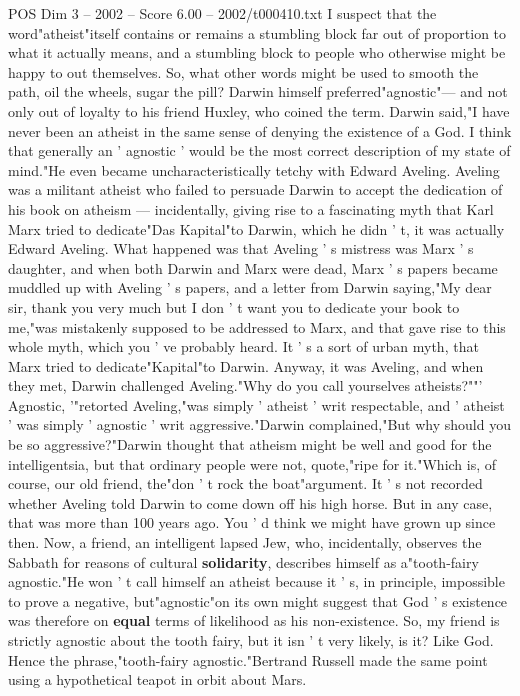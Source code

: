 \begin{textsample}{POS Dim 3 – 2002 – Score 6.00 – 2002/t000410.txt}
I suspect that the word"atheist"itself contains or remains a stumbling block far out of proportion to what it actually means, and a stumbling block to people who otherwise might be happy to out themselves.
So, what other words might be used to smooth the path, oil the wheels, sugar the pill?
Darwin himself preferred"agnostic"— and not only out of loyalty to his friend Huxley, who coined the term.
Darwin said,"I have never been an atheist in the same sense of denying the existence of a God.
I think that generally an ' agnostic ' would be the most correct description of my state of mind."He even became uncharacteristically tetchy with Edward Aveling.
Aveling was a militant atheist who failed to persuade Darwin to accept the dedication of his book on atheism — incidentally, giving rise to a fascinating myth that Karl Marx tried to dedicate"Das Kapital"to Darwin, which he didn ' t, it was actually Edward Aveling.
What happened was that Aveling ' s mistress was Marx ' s daughter, and when both Darwin and Marx were dead, Marx ' s papers became muddled up with Aveling ' s papers, and a letter from Darwin saying,"My dear sir, thank you very much but I don ' t want you to dedicate your book to me,"was mistakenly supposed to be addressed to Marx, and that gave rise to this whole myth, which you ' ve probably heard.
It ' s a sort of urban myth, that Marx tried to dedicate"Kapital"to Darwin.
Anyway, it was Aveling, and when they met, Darwin challenged Aveling."Why do you call yourselves atheists?""' Agnostic, '"retorted Aveling,"was simply ' atheist ' writ respectable, and ' atheist ' was simply ' agnostic ' writ aggressive."Darwin complained,"But why should you be so aggressive?"Darwin thought that atheism might be well and good for the intelligentsia, but that ordinary people were not, quote,"ripe for it."Which is, of course, our old friend, the"don ' t rock the boat"argument.
It ' s not recorded whether Aveling told Darwin to come down off his high horse.
But in any case, that was more than 100 years ago.
You ' d think we might have grown up since then.
Now, a friend, an intelligent lapsed Jew, who, incidentally, observes the Sabbath for reasons of cultural \textbf{solidarity}, describes himself as a"tooth-fairy agnostic."He won ' t call himself an atheist because it ' s, in principle, impossible to prove a negative, but"agnostic"on its own might suggest that God ' s existence was therefore on \textbf{equal} terms of likelihood as his non-existence.
So, my friend is strictly agnostic about the tooth fairy, but it isn ' t very likely, is it?
Like God.
Hence the phrase,"tooth-fairy agnostic."Bertrand Russell made the same point using a hypothetical teapot in orbit about Mars.

\end{textsample}
